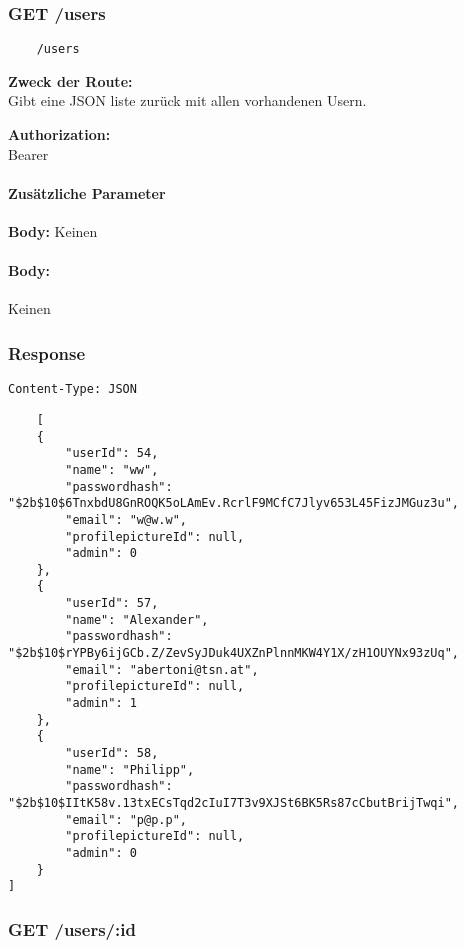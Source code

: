 \label{/users}

\subsubsection{GET /users}

\begin{lstlisting}
    /users
\end{lstlisting}

\textbf{Zweck der Route:} \\
Gibt  eine JSON liste zurück mit allen vorhandenen Usern.

\textbf{Authorization:} \\
Bearer

\paragraph{Zusätzliche Parameter}

\textbf{Body:}
Keinen

\paragraph{Body:}

Keinen

\newpage

\subsubsection{Response}

\lstinline{Content-Type: JSON}
\begin{lstlisting}
    [
    {
        "userId": 54,
        "name": "ww",
        "passwordhash": "$2b$10$6TnxbdU8GnROQK5oLAmEv.RcrlF9MCfC7Jlyv653L45FizJMGuz3u",
        "email": "w@w.w",
        "profilepictureId": null,
        "admin": 0
    },
    {
        "userId": 57,
        "name": "Alexander",
        "passwordhash": "$2b$10$rYPBy6ijGCb.Z/ZevSyJDuk4UXZnPlnnMKW4Y1X/zH1OUYNx93zUq",
        "email": "abertoni@tsn.at",
        "profilepictureId": null,
        "admin": 1
    },
    {
        "userId": 58,
        "name": "Philipp",
        "passwordhash": "$2b$10$IItK58v.13txECsTqd2cIuI7T3v9XJSt6BK5Rs87cCbutBrijTwqi",
        "email": "p@p.p",
        "profilepictureId": null,
        "admin": 0
    }
]
\end{lstlisting}

\pagebreak

\subsubsection{GET /users/:id}


